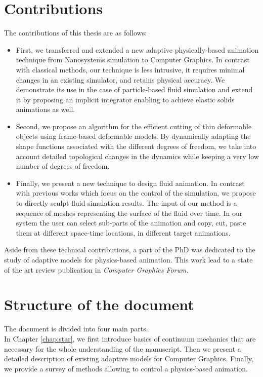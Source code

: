 \section{Contributions}
The contributions of this thesis are as follows:
\begin{itemize}
    \item First, we transferred and extended a new adaptive physically-based animation technique from Nanosystems simulation to Computer Graphics. In contrast with classical methods, our technique is less intrusive, it requires minimal changes in an existing simulator, and retains physical accuracy. We demonstrate its use in the case of particle-based fluid simulation and extend it by proposing an implicit integrator enabling to achieve elastic solids animations as well.
    \item Second, we propose an algorithm for the efficient cutting of thin deformable objects using frame-based deformable models. By dynamically adapting the shape functions associated with the different degrees of freedom, we take into account detailed topological changes in the dynamics while keeping a very low number of degrees of freedom.
    \item Finally, we present a new technique to design fluid animation. In contrast with previous works which focus on the control of the simulation, we propose to directly sculpt fluid simulation results. The input of our method is a sequence of meshes representing the surface of the fluid over time. In our system the user can select sub-parts of the animation and copy, cut, paste them at different space-time locations, in different target animations.
\end{itemize}

Aside from these technical contributions, a part of the PhD was dedicated to the study of adaptive models for physics-based animation. This work lead to a state of the art review publication in \emph{Computer Graphics Forum.}

\section{Structure of the document}
The document is divided into four main parts. \\

In Chapter \ref{chap:star}, we first introduce basics of continuum mechanics that are necessary for the whole understanding of the manuscript. Then we present a detailed description of existing adaptive models for Computer Graphics. Finally, we provide a survey of methods allowing to control a physics-based animation. \\

